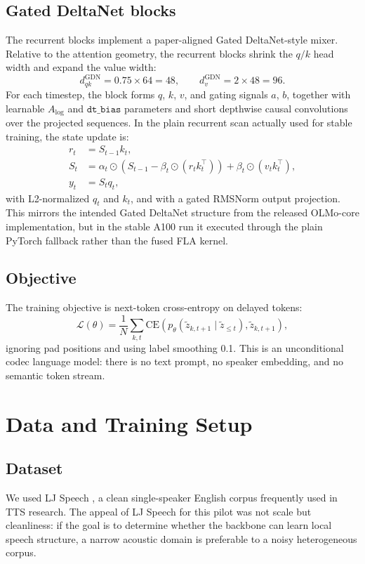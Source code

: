 \documentclass[11pt]{article}
\begin{document}
\subsection{Gated DeltaNet blocks}
The recurrent blocks implement a paper-aligned Gated DeltaNet-style mixer. Relative to the attention geometry, the recurrent blocks shrink the $q/k$ head width and expand the value width:
\[
d_{qk}^{\text{GDN}} = 0.75 \times 64 = 48,\qquad d_{v}^{\text{GDN}} = 2 \times 48 = 96.
\]
For each timestep, the block forms $q$, $k$, $v$, and gating signals $a$, $b$, together with learnable $A_{\log}$ and $\texttt{dt\_bias}$ parameters and short depthwise causal convolutions over the projected sequences. In the plain recurrent scan actually used for stable training, the state update is:
\begin{align}
r_t &= S_{t-1} k_t, \\
S_t &= \alpha_t \odot \left(S_{t-1} - \beta_t \odot (r_t k_t^\top)\right) + \beta_t \odot (v_t k_t^\top), \\
y_t &= S_t q_t,
\end{align}
with L2-normalized $q_t$ and $k_t$, and with a gated RMSNorm output projection. This mirrors the intended Gated DeltaNet structure from the released OLMo-core implementation, but in the stable A100 run it executed through the plain PyTorch fallback rather than the fused FLA kernel.

\subsection{Objective}
The training objective is next-token cross-entropy on delayed tokens:
\[
\mathcal{L}(\theta) =
\frac{1}{N}
\sum_{k,t}
\mathrm{CE}\!\left(
p_{\theta}(\tilde{z}_{k,t+1}\mid \tilde{z}_{\le t}),
\tilde{z}_{k,t+1}
\right),
\]
ignoring pad positions and using label smoothing 0.1. This is an unconditional codec language model: there is no text prompt, no speaker embedding, and no semantic token stream.

\section{Data and Training Setup}
\subsection{Dataset}
We used LJ Speech \citep{ito2017ljspeech}, a clean single-speaker English corpus frequently used in TTS research. The appeal of LJ Speech for this pilot was not scale but cleanliness: if the goal is to determine whether the backbone can learn local speech structure, a narrow acoustic domain is preferable to a noisy heterogeneous corpus.
\end{document}
